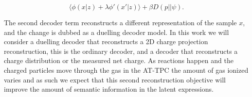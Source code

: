 \begin{equation}\label{eq:duelling_decoder}
\langle\phi(x|z) + \lambda\phi'(x'|z) \rangle + \beta D(p || \psi).
\end{equation}

\noindent The second decoder term reconstructs a different representation of the sample $x$, and the change is dubbed as a duelling decoder model. In this work we will consider a duelling decoder that reconstructs a 2D charge projection reconstruction, this is the ordinary decoder, and a decoder that reconstructs a charge distribution or the measured net charge. As reactions happen and the charged particles move through the gas in the AT-TPC the amount of gas ionized varies and as such we expect that this second reconstruction objective will improve the amount of semantic information in the latent expressions.


